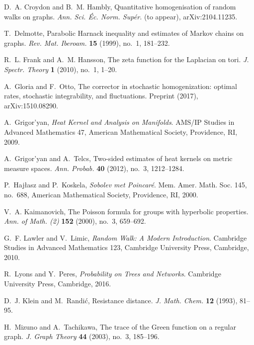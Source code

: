 \documentclass{article}
\numberwithin{equation}{section}
\theoremstyle{definition}
\theoremstyle{remark}
\begin{document}
\begin{thebibliography}{99}
D.~A. Croydon and B.~M. Hambly, Quantitative homogenisation of random walks on graphs.
\emph{Ann. Sci. Éc. Norm. Supér.} (to appear), arXiv:2104.11235.

T.~Delmotte, Parabolic Harnack inequality and estimates of Markov chains on graphs.
\emph{Rev. Mat. Iberoam.} \textbf{15} (1999), no.~1, 181--232.

R.~L. Frank and A.~M. Hansson, The zeta function for the Laplacian on tori.
\emph{J. Spectr. Theory} \textbf{1} (2010), no.~1, 1--20.

A.~Gloria and F.~Otto, The corrector in stochastic homogenization: optimal rates, stochastic integrability, and fluctuations.
Preprint (2017), arXiv:1510.08290.

A.~Grigor'yan, \emph{Heat Kernel and Analysis on Manifolds}.
AMS/IP Studies in Advanced Mathematics 47, American Mathematical Society, Providence, RI, 2009.

A.~Grigor'yan and A.~Telcs, Two-sided estimates of heat kernels on metric measure spaces.
\emph{Ann. Probab.} \textbf{40} (2012), no.~3, 1212--1284.

P.~Hajłasz and P.~Koskela, \emph{Sobolev met Poincaré}.
Mem. Amer. Math. Soc. 145, no.~688, American Mathematical Society, Providence, RI, 2000.

V.~A. Kaimanovich, The Poisson formula for groups with hyperbolic properties.
\emph{Ann. of Math. (2)} \textbf{152} (2000), no.~3, 659--692.

G.~F. Lawler and V.~Limic, \emph{Random Walk: A Modern Introduction}.
Cambridge Studies in Advanced Mathematics 123, Cambridge University Press, Cambridge, 2010.

R.~Lyons and Y.~Peres, \emph{Probability on Trees and Networks}.
Cambridge University Press, Cambridge, 2016.

D.~J. Klein and M.~Randi{\'c}, Resistance distance.
\emph{J. Math. Chem.} \textbf{12} (1993), 81--95.

H.~Mizuno and A.~Tachikawa, The trace of the Green function on a regular graph.
\emph{J. Graph Theory} \textbf{44} (2003), no.~3, 185--196.

\end{thebibliography}
\end{document}
